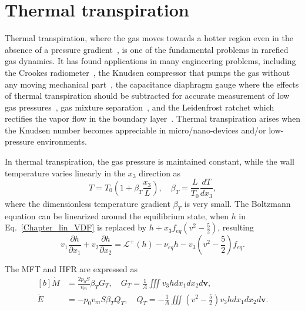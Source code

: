 \section{Thermal transpiration}
\label{poiseuille_dis}


Thermal transpiration, where the gas moves towards a hotter region even in the absence of a pressure gradient~\citep{Reynolds1879,Maxwell1879vii}, is one of the fundamental problems in rarefied gas dynamics. It has found applications in many engineering problems, including the Crookes radiometer~\cite{crookes1874xv}, the Knudsen compressor that pumps the gas without any moving mechanical part~\citep{vargo1999knudsen,gupta2008thermal}, the capacitance diaphragm gauge where the effects of thermal transpiration should be subtracted for accurate measurement of low gas pressures~\citep{Sentina1999,Daude2014Vacuum}, gas mixture separation~\citep{Takata2007EJMB}, and the Leidenfrost ratchet which rectifies the vapor flow in the boundary layer~\citep{wurger2011leidenfrost}. Thermal transpiration arises when the Knudsen number becomes appreciable in micro/nano-devices and/or low-pressure environments.


In thermal transpiration, the gas pressure is maintained constant, while the wall temperature varies linearly in the $x_3$ direction as
\begin{equation}
T=T_0\left(1+\beta_T\frac{x_3}{L}\right), \quad
\beta_T=\frac{L}{T_0}\frac{dT}{dx_3},
\end{equation} 
where the dimensionless temperature gradient $\beta_T$ is very small. The Boltzmann equation can be linearized around the equilibrium state, when $h$ in Eq.~\eqref{Chapter_lin_VDF} is replaced by $h+x_3f_{eq}({v}^2-\frac{5}{2})$, resulting 
\begin{equation}\label{thermal_tube}
v_1\frac{\partial h}{\partial x_1}+v_2\frac{\partial h}{\partial x_2}=\mathcal{L}^+(h)-\nu_{eq}{h}-{v_3}\left({v}^2-\frac{5}{2}\right)f_{eq}.
\end{equation}


The MFT and HFR are expressed as
\begin{equation}\label{normalized_MFR_thermal}  
\begin{aligned}[b]
\dot{M}&=\frac{2p_0S}{v_m}\beta_TG_T, \quad  G_T=\frac{1}{A}\iiint {v_3h}dx_1dx_2d\bm{v}, \\
\dot{E}&=-p_0v_mS\beta_T{}Q_T, \quad   Q_T=-\frac{1}{A}\iiint {\left({v}^2-\frac{5}{2}\right)v_3}hdx_1dx_2d\bm{v}.
\end{aligned}
\end{equation}







